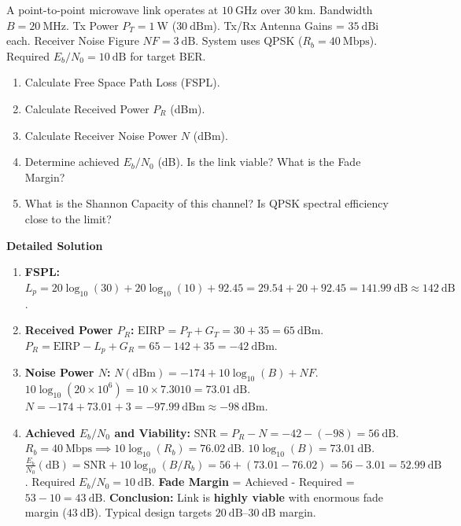 \documentclass[11pt]{article}
\begin{document}
\begin{exoresolu}
A point-to-point microwave link operates at $10\ \mathrm{GHz}$ over $30\ \mathrm{km}$. Bandwidth $B = 20\ \mathrm{MHz}$. Tx Power $P_T = 1\ \mathrm{W}$ ($30\ \mathrm{dBm}$). Tx/Rx Antenna Gains = $35\ \mathrm{dBi}$ each. Receiver Noise Figure $NF = 3\ \mathrm{dB}$. System uses QPSK ($R_b = 40\ \mathrm{Mbps}$). Required $E_b/N_0 = 10\ \mathrm{dB}$ for target BER.
\begin{enumerate}
\item Calculate Free Space Path Loss (FSPL).
\item Calculate Received Power $P_R$ (dBm).
\item Calculate Receiver Noise Power $N$ (dBm).
\item Determine achieved $E_b/N_0$ (dB). Is the link viable? What is the Fade Margin?
\item What is the Shannon Capacity of this channel? Is QPSK spectral efficiency close to the limit?
\end{enumerate}
\tcblower
\textbf{Detailed Solution}
\begin{enumerate}
\item \textbf{FSPL:}
$L_p = 20\log_{10}(30) + 20\log_{10}(10) + 92.45 = 29.54 + 20 + 92.45 = 141.99\ \mathrm{dB} \approx 142\ \mathrm{dB}$.

\item \textbf{Received Power $P_R$:}
$\mathrm{EIRP} = P_T + G_T = 30 + 35 = 65\ \mathrm{dBm}$.
$P_R = \mathrm{EIRP} - L_p + G_R = 65 - 142 + 35 = -42\ \mathrm{dBm}$.

\item \textbf{Noise Power $N$:}
$N(\mathrm{dBm}) = -174 + 10\log_{10}(B) + NF$.
$10\log_{10}(20 \times 10^6) = 10 \times 7.3010 = 73.01\ \mathrm{dB}$.
$N = -174 + 73.01 + 3 = -97.99\ \mathrm{dBm} \approx -98\ \mathrm{dBm}$.

\item \textbf{Achieved $E_b/N_0$ and Viability:}
$\mathrm{SNR} = P_R - N = -42 - (-98) = 56\ \mathrm{dB}$.
$R_b = 40\ \mathrm{Mbps} \implies 10\log_{10}(R_b) = 76.02\ \mathrm{dB}$.
$10\log_{10}(B) = 73.01\ \mathrm{dB}$.
$\frac{E_b}{N_0} (\mathrm{dB}) = \mathrm{SNR} + 10\log_{10}(B/R_b) = 56 + (73.01 - 76.02) = 56 - 3.01 = 52.99\ \mathrm{dB}$.
Required $E_b/N_0 = 10\ \mathrm{dB}$.
\textbf{Fade Margin} = Achieved - Required = $53 - 10 = 43\ \mathrm{dB}$.
\textbf{Conclusion:} Link is \textbf{highly viable} with enormous fade margin ($43\ \mathrm{dB}$). Typical design targets $20\ \mathrm{dB}$--$30\ \mathrm{dB}$ margin.


\end{enumerate}
\end{exoresolu}
\end{document}
